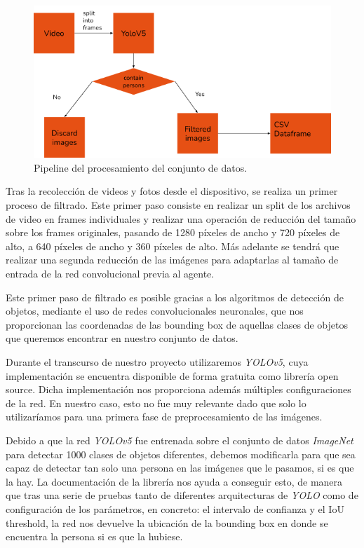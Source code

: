 \begin{figure}[ht!]
    \centering
    \includegraphics[scale=0.6]{figuras/data_preprocessing.png}
    \caption[Pipeline del procesamiento del conjunto de datos]{Pipeline del procesamiento del conjunto de datos.}
    \label{fig-preprocesamiento-datos}
\end{figure}


Tras la recolección de videos y fotos desde el dispositivo, se realiza un primer proceso de filtrado. Este primer paso consiste en realizar un split de los archivos de video en frames individuales y realizar una operación de reducción del tamaño sobre los frames originales, pasando de 1280 píxeles de ancho y 720 píxeles de alto, a 640 píxeles de ancho y 360 píxeles de alto. Más adelante se tendrá que realizar una segunda reducción de las imágenes para adaptarlas al tamaño de entrada de la red convolucional previa al agente.
\medskip

Este primer paso de filtrado es posible gracias a los algoritmos de detección de objetos, mediante el uso de redes convolucionales neuronales, que nos proporcionan las coordenadas de las bounding box de aquellas clases de objetos que queremos encontrar en nuestro conjunto de datos.
\medskip

Durante el transcurso de nuestro proyecto utilizaremos \textit{YOLOv5}, cuya implementación se encuentra disponible de forma gratuita como librería open source. Dicha implementación nos proporciona además múltiples configuraciones de la red. En nuestro caso, esto no fue muy relevante dado que solo lo utilizaríamos para una primera fase de preprocesamiento de las imágenes.
\medskip

Debido a que la red \textit{YOLOv5} fue entrenada sobre el conjunto de datos \textit{ImageNet} \citep{imagenet} para detectar 1000 clases de objetos diferentes, debemos modificarla para que sea capaz de detectar tan solo una persona en las imágenes que le pasamos, si es que la hay. La documentación de la librería nos ayuda a conseguir esto, de manera que tras una serie de pruebas tanto de diferentes arquitecturas de \textit{YOLO} como de configuración de los parámetros, en concreto: el intervalo de confianza y  el IoU threshold, la red nos devuelve la ubicación de la bounding box en donde se encuentra la persona si es que la hubiese.
\medskip

